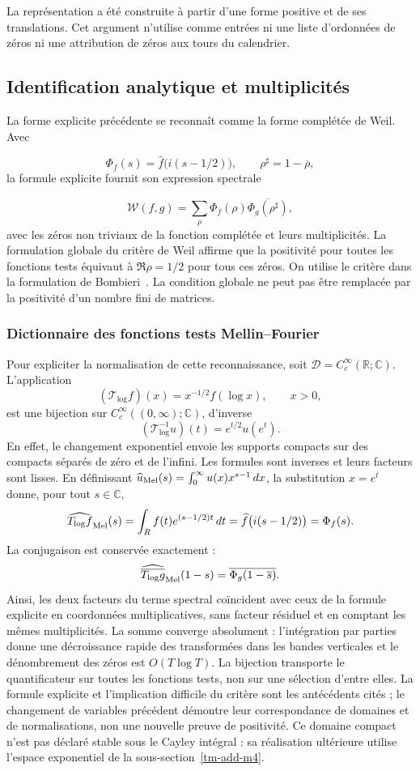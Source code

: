 La représentation a été construite à partir d'une forme positive et de ses translations. Cet argument n'utilise comme entrées ni une liste d'ordonnées de zéros ni une attribution de zéros aux tours du calendrier.

\subsection{Identification analytique et multiplicités}
\label{rz:identificacion}
La forme explicite précédente se reconnaît comme la forme complétée de Weil. Avec

\[
\Phi_f(s)=\widehat f\bigl(i(s-1/2)\bigr),
\qquad \rho^\sharp=1-\overline\rho,
\]
la formule explicite fournit son expression spectrale

\[
\mathscr W(f,g)=\sum_\rho
\Phi_f(\rho)\overline{\Phi_g(\rho^\sharp)},
\]
avec les zéros non triviaux de la fonction complétée et leurs multiplicités. La formulation globale du critère de Weil affirme que la positivité pour toutes les fonctions tests équivaut à \(\Re\rho=1/2\) pour tous ces zéros. On utilise le critère dans la formulation de Bombieri~\cite{bombieri2000}. La condition globale ne peut pas être remplacée par la positivité d'un nombre fini de matrices.

\subsubsection*{Dictionnaire des fonctions tests Mellin--Fourier}
\label{rz:mellin-fourier}
Pour expliciter la normalisation de cette reconnaissance, soit
\(\mathcal D=C_c^\infty(\mathbb R;\mathbb C)\). L’application
\[
 (\mathcal T_{\log}f)(x)=x^{-1/2}f(\log x),\qquad x>0,
\]
est une bijection sur \(C_c^\infty((0,\infty);\mathbb C)\), d'inverse
\[
 (\mathcal T_{\log}^{-1}u)(t)=e^{t/2}u(e^t).
\]
En effet, le changement exponentiel envoie les supports compacts sur des compacts
séparés de zéro et de l'infini. Les formules sont inverses et leurs facteurs
sont lisses. En définissant
\(\widehat u_{\rm Mel}(s)=\int_0^\infty u(x)x^{s-1}\,dx\),
la substitution \(x=e^t\) donne, pour tout \(s\in\mathbb C\),
\[
 \widehat{\mathcal T_{\log}f}_{\rm Mel}(s)
 =\int_{\mathbb R}f(t)e^{(s-1/2)t}\,dt
 =\widehat f\bigl(i(s-1/2)\bigr)=\Phi_f(s).
\]
La conjugaison est conservée exactement :
\[
 \widehat{\overline{\mathcal T_{\log}g}}_{\rm Mel}(1-s)
 =\overline{\Phi_g(1-\overline s)}.
\]
Ainsi, les deux facteurs du terme spectral coïncident avec ceux de la
formule explicite en coordonnées multiplicatives, sans facteur résiduel
et en comptant les mêmes multiplicités. La somme converge absolument :
l’intégration par parties donne une décroissance rapide des transformées
dans les bandes verticales et le dénombrement des zéros est \(O(T\log T)\).
La bijection transporte le quantificateur sur toutes les fonctions tests, non sur une
sélection d’entre elles. La formule explicite et l’implication difficile du
critère sont les antécédents cités ; le changement de variables précédent
démontre leur correspondance de domaines et de normalisations, non une nouvelle
preuve de positivité. Ce domaine compact n’est pas déclaré stable sous
le Cayley intégral : sa réalisation ultérieure utilise l’espace exponentiel
de la sous-section~\ref{tm-add-m4}.

